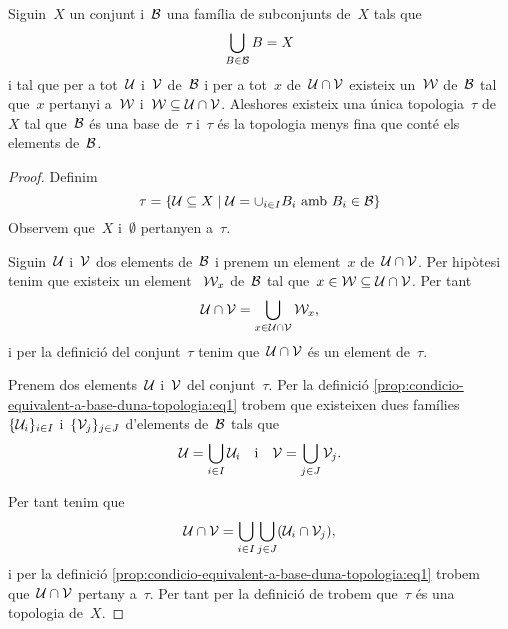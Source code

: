 \documentclass[../../main.tex]{subfiles}
\begin{document}
    \begin{proposition}
        \label{prop:condicio-equivalent-a-base-duna-topologia}
        \label{prop:condicio-per-que-una-topologia-sigui-la-mes-fina-que-conte-una-base}
        Siguin~\(X\) un conjunt i~\(\mathcal{B}\) una família de subconjunts de~\(X\) tals que
        \[
            \bigcup_{B\in\mathcal{B}}B=X
        \]
        i tal que per a tot~\(\mathcal{U}\) i~\(\mathcal{V}\) de~\(\mathcal{B}\) i per a tot~\(x\) de~\(\mathcal{U}\cap\mathcal{V}\) existeix un~\(\mathcal{W}\) de~\(\mathcal{B}\) tal que~\(x\) pertanyi a~\(\mathcal{W}\) i~\(\mathcal{W}\subseteq\mathcal{U}\cap\mathcal{V}\).    Aleshores existeix una única topologia~\(\tau\) de~\(X\) tal que~\(\mathcal{B}\) és una base de~\(\tau\) i~\(\tau\) és la topologia menys fina que conté els elements de~\(\mathcal{B}\).
    \end{proposition}
    \begin{proof}
        Definim
        \begin{equation}
            \label{prop:condicio-equivalent-a-base-duna-topologia:eq1}
            \tau=\left\{\obert{U}\subseteq X\mid\obert{U}=\cup_{i\in I}B_{i}\text{ amb }B_{i}\in\base{B}\right\}
        \end{equation}
        Observem que~\(X\) i~\(\emptyset\) pertanyen a~\(\tau\).

        Siguin~\(\mathcal{U}\) i~\(\mathcal{V}\) dos elements de~\(\mathcal{B}\) i prenem un element~\(x\) de~\(\mathcal{U}\cap\mathcal{V}\).
        Per hipòtesi tenim que existeix un element ~\(\mathcal{W}_{x}\) de~\(\mathcal{B}\) tal que~\(x\in\mathcal{W}\subseteq\mathcal{U}\cap\mathcal{V}\).
        Per tant
        \[
            \mathcal{U}\cap\mathcal{V}=\bigcup_{x\in\mathcal{U}\cap\mathcal{V}}\mathcal{W}_{x},
        \]
        i per la definició del conjunt~\(\tau\) tenim que~\(\mathcal{U}\cap\mathcal{V}\) és un element de~\(\tau\).

        Prenem dos elements~\(\mathcal{U}\) i~\(\mathcal{V}\) del conjunt~\(\tau\).
        Per la definició \eqref{prop:condicio-equivalent-a-base-duna-topologia:eq1} trobem que existeixen dues famílies~\(\{\mathcal{U}_{i}\}_{i\in I}\) i~\(\{\mathcal{V}_{j}\}_{j\in J}\) d'elements de~\(\mathcal{B}\) tals que
        \[
            \mathcal{U}=\bigcup_{i\in I}\mathcal{U}_{i}\quad\text{i}\quad\mathcal{V}=\bigcup_{j\in J}\mathcal{V}_{j}.
        \]

        Per tant tenim que
        \[
            \mathcal{U}\cap\mathcal{V}=\bigcup_{i\in I}\bigcup_{j\in J}(\mathcal{U}_{i}\cap\mathcal{V}_{j}),
        \]
        i per la definició \eqref{prop:condicio-equivalent-a-base-duna-topologia:eq1} trobem que~\(\mathcal{U}\cap\mathcal{V}\) pertany a~\(\tau\).
        Per tant per la definició de  trobem que~\(\tau\) és una topologia de~\(X\).


\end{proof}
\end{document}
